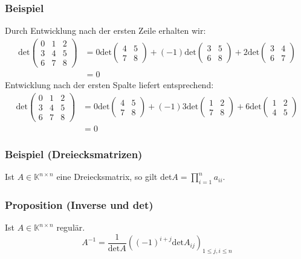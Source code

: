 \subsubsection{Beispiel}
Durch Entwicklung nach der ersten Zeile erhalten wir:
\begin{align*}
\mathrm{det}\begin{pmatrix}0 & 1 & 2\\ 3 & 4 & 5\\ 6 & 7 & 8\end{pmatrix}&=0\mathrm{det}\begin{pmatrix}4 & 5\\ 7 & 8\end{pmatrix}+(-1)\mathrm{det}\begin{pmatrix}3 & 5\\ 6 & 8\end{pmatrix}+2\mathrm{det}\begin{pmatrix}3 & 4\\ 6 & 7\end{pmatrix}\\
&=0
\end{align*}
Entwicklung nach der ersten Spalte liefert entsprechend:
\begin{align*}
\mathrm{det}\begin{pmatrix}0 & 1 & 2\\ 3 & 4 & 5\\ 6 & 7 & 8\end{pmatrix}&=0\mathrm{det}\begin{pmatrix}4 & 5\\ 7 & 8\end{pmatrix}+(-1)3\mathrm{det}\begin{pmatrix}1 & 2\\ 7 & 8\end{pmatrix}+6\mathrm{det}\begin{pmatrix}1 & 2\\ 4 & 5\end{pmatrix}\\
&=0
\end{align*}
\subsubsection{Beispiel (Dreiecksmatrizen)}
Ist $A\in\mathbb{K}^{n\times n}$ eine Dreiecksmatrix, so gilt det$A=\prod _{i=1}^n a_{ii}$.
\subsubsection{Proposition (Inverse und det)}
Ist $A\in\mathbb{K}^{n\times n}$ regulär.
\[A^{-1}=\frac{1}{\mathrm{det}A}\left( (-1)^{i+j}\mathrm{det}A_{ij}\right)_{1\leq j,i\leq n}\]
